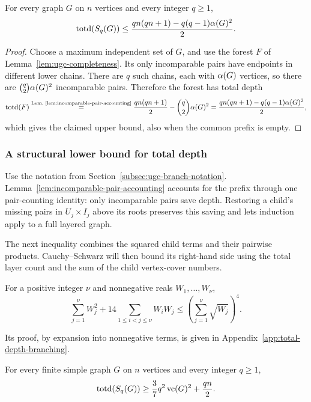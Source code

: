 \begin{lemma}
\label{lem:total-depth-completeness}
For every graph $G$ on $n$ vertices and every integer $q\geq1$,
\[
 \operatorname{totd}(S_q(G))\leq
 \frac{qn(qn+1)-q(q-1)\alpha(G)^2}{2}.
\]
\end{lemma}

\begin{proof}
Choose a maximum independent set of $G$, and use the forest $F$ of
Lemma~\ref{lem:ugc-completeness}. Its only incomparable pairs have endpoints in
different lower chains. There are $q$ such chains, each with
$\alpha(G)$ vertices, so there are
$\binom q2\alpha(G)^2$ incomparable pairs. Therefore the forest has
total depth
\[
 \operatorname{totd}(F)\overset{\text{Lem.~\ref{lem:incomparable-pair-accounting}}}{=}
 \frac{qn(qn+1)}2-\binom q2\alpha(G)^2
 =\frac{qn(qn+1)-q(q-1)\alpha(G)^2}{2},
\]
which gives the claimed upper bound, also when the common prefix is empty.
\end{proof}

\subsubsection{A structural lower bound for total depth}

Use the notation from Section~\ref{subsec:ugc-branch-notation}.
Lemma~\ref{lem:incomparable-pair-accounting} accounts for the prefix
through one pair-counting identity: only incomparable pairs save depth. Restoring a child's
missing pairs in $U_j\times I_j$ above its roots preserves this
saving and lets induction apply to a full layered graph.

The next inequality combines the squared child terms and their
pairwise products. Cauchy--Schwarz will then bound its right-hand side
using the total layer count and the sum of the child vertex-cover numbers.

\begin{lemma}
\label{lem:quadratic-branching}
For a positive integer $\nu$ and nonnegative reals $W_1,\ldots,W_\nu$,
\[
 \sum_{j=1}^{\nu} W_j^2+14\sum_{1\leq i<j\leq \nu}W_iW_j
 \leq\left(\sum_{j=1}^{\nu} \sqrt{W_j}\right)^4.
\]
\end{lemma}

Its proof, by expansion into nonnegative terms, is given in
Appendix~\ref{app:total-depth-branching}.

\begin{theorem}
\label{thm:total-depth-structural}
For every finite simple graph $G$ on $n$ vertices and every integer
$q\geq1$,
\begin{equation}\label{eq:total-depth-structural}
 \operatorname{totd}(S_q(G))\geq
 \frac37q^2\operatorname{vc}(G)^2+\frac{qn}{2}.
\end{equation}
\end{theorem}

